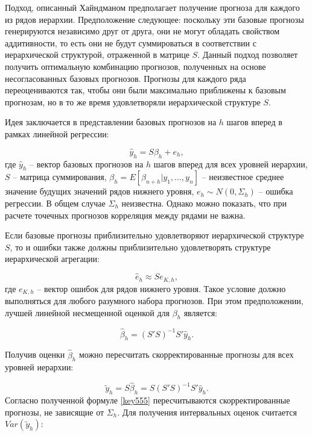 \documentclass[12pt,a4paper, oneside]{extreport}
\begin{document}
Подход, описанный Хайндманом\cite{hyndman2016fast} предполагает получение прогноза для  каждого из рядов иерархии. Предположение следующее: поскольку эти базовые прогнозы генерируются независимо друг от друга,  они не могут обладать свойством аддитивности, то есть они не  будут суммироваться в соответствии с иерархической структурой, отраженной в матрице $S$. Данный подход позволяет получить оптимальную комбинацию прогнозов, полученных на основе несогласованных базовых прогнозов.  Прогнозы для каждого ряда переоцениваются так, чтобы они были максимально приближены к базовым прогнозам, но в то же время удовлетворяли   иерархической структуре $S$. 


Идея заключается в представлении
базовых прогнозов на $h$ шагов вперед в рамках линейной регрессии:


\begin{equation}\label{abc}
 \hat{y}_h = S \beta_h + e_h  ,
\end{equation}
\noindent
где $ \hat{y}_h $ -- вектор базовых прогнозов  на $h$ шагов вперед для всех уровней иерархии, $S$ --  матрица суммирования, 
$ \beta_h = E [ \beta_{n + h} | y_1 , \dots , y_n ]  $
--  неизвестное среднее значение будущих значений рядов нижнего уровня, 
$ e_h \sim N(0,\Sigma_h ) $ -- ошибка регрессии. 
В общем случае $\Sigma_h$ неизвестна. Однако можно показать, что при расчете точечных прогнозов корреляция между рядами не важна. 

Если базовые прогнозы приблизительно удовлетворяют  иерархической структуре $S$, то и ошибки также должны приблизительно удовлетворять структуре иерархической агрегации:

\begin{equation}\label{key}
\hat{e}_h \approx S  e_{K,h}  ,
\end{equation}
\noindent
где $e_{K,h}$  -- вектор ошибок для рядов нижнего уровня. 
Такое условие  должно выполняться  для любого разумного набора прогнозов. 
При этом предположении,  лучшей  линейной несмещенной оценкой   для $\beta_h$ является:

\begin{equation}\label{key}
\hat{\beta}_h = ( S'  S )^{-1}  S'    \hat{y}_h .
\end{equation}

Получив оценки $\hat{\beta}_h $ можно пересчитать скорректированные прогнозы для всех уровней иерархии:

\begin{equation}\label{key555}
 \tilde{y}_h
= S \hat{\beta}_h  = S ( S'  S )^{-1}  S'    \hat{y}_h .
\end{equation}
 Согласно полученной формуле \ref{key555} пересчитываются скорректированные  прогнозы, не зависящие  от  $\Sigma_h$. 
 Для получения интервальных оценок считается   $Var(\tilde{y}_h)$:
 
\end{document}
